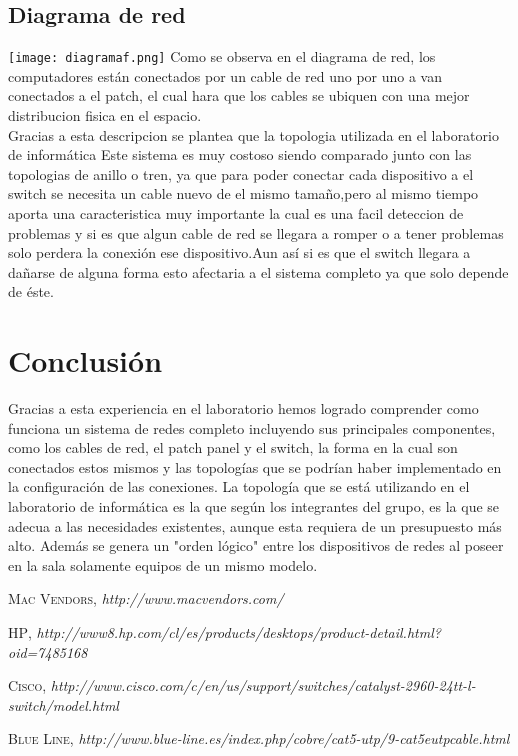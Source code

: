 \documentclass{udpreport}
\begin{document}
	\section{Diagrama de red}
		\texttt{[image: diagramaf.png]}
		Como se observa en el diagrama de red, los computadores están conectados por un cable de red uno por uno 
		a van conectados a el patch, el cual hara que los cables se ubiquen con una mejor distribucion fisica 
		en el espacio.\\
		Gracias a esta descripcion se plantea que la topologia utilizada en el laboratorio de informática
		Este sistema es muy costoso siendo comparado junto con las topologias de anillo o tren, ya que para poder
		conectar cada dispositivo a el switch se necesita un cable nuevo de el mismo tamaño,pero al mismo tiempo
		aporta una caracteristica muy importante la cual es una facil deteccion de problemas y si es que algun
		cable de red se llegara a romper o a tener problemas solo perdera la conexión  ese dispositivo.Aun así 
		si es que el switch llegara a dañarse de alguna forma esto afectaria a el sistema completo ya que solo
		depende de éste.
\chapter{Conclusión}
                Gracias a esta experiencia en el laboratorio hemos logrado comprender como funciona un sistema de redes completo 
                incluyendo sus principales componentes, como los cables de red, el patch panel y el switch, la forma en la cual son 
                conectados estos mismos y las topologías que se podrían haber implementado en la configuración de las conexiones. La 
                topología que se está utilizando en el laboratorio de informática es la que según los integrantes del grupo, es la que
                se adecua a las necesidades existentes, aunque esta requiera de un presupuesto más alto. Además se genera un "orden 
                lógico" entre los dispositivos de redes al poseer en la sala solamente equipos de un mismo modelo.
\begin{thebibliography}{x}

 \textsc{Mac Vendors},
\textit{http://www.macvendors.com/}

 \textsc{HP},
\textit{http://www8.hp.com/cl/es/products/desktops/product-detail.html?oid=7485168}

 \textsc{Cisco},
\textit{http://www.cisco.com/c/en/us/support/switches/catalyst-2960-24tt-l-switch/model.html}

 \textsc{Blue Line},
\textit{http://www.blue-line.es/index.php/cobre/cat5-utp/9-cat5eutpcable.html}

\end{thebibliography}
\end{document}
